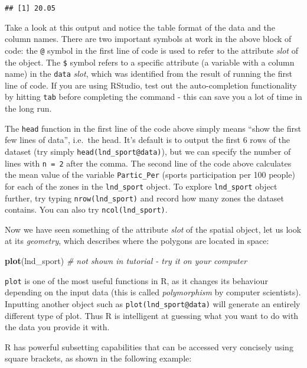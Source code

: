\documentclass[]{article}
\newenvironment{Shaded}{}{}
\newcommand{\KeywordTok}[1]{\textcolor[rgb]{0.00,0.44,0.13}{\textbf{{#1}}}}
\newcommand{\CommentTok}[1]{\textcolor[rgb]{0.38,0.63,0.69}{\textit{{#1}}}}
\newcommand{\NormalTok}[1]{{#1}}
\begin{document}
\begin{verbatim}
## [1] 20.05
\end{verbatim}

Take a look at this output and notice the table format of the data and
the column names. There are two important symbols at work in the above
block of code: the \texttt{@} symbol in the first line of code is used
to refer to the attribute \emph{slot} of the object. The \texttt{\$}
symbol refers to a specific attribute (a variable with a column name) in
the \texttt{data} \emph{slot}, which was identified from the result of
running the first line of code. If you are using RStudio, test out the
auto-completion functionality by hitting \texttt{tab} before completing
the command - this can save you a lot of time in the long run.

The \texttt{head} function in the first line of the code above simply
means ``show the first few lines of data'', i.e.~the head. It's default
is to output the first 6 rows of the dataset (try simply
\texttt{head(lnd\_sport@data)}), but we can specify the number of lines
with \texttt{n = 2} after the comma. The second line of the code above
calculates the mean value of the variable \texttt{Partic\_Per} (sports
participation per 100 people) for each of the zones in the
\texttt{lnd\_sport} object. To explore \texttt{lnd\_sport} object
further, try typing \texttt{nrow(lnd\_sport)} and record how many zones
the dataset contains. You can also try \texttt{ncol(lnd\_sport)}.

Now we have seen something of the attribute \emph{slot} of the spatial
object, let us look at its \emph{geometry}, which describes where the
polygons are located in space:

\begin{Shaded}
\begin{Highlighting}[]
\KeywordTok{plot}\NormalTok{(lnd_sport) }\CommentTok{# not shown in tutorial - try it on your computer}
\end{Highlighting}
\end{Shaded}

\texttt{plot} is one of the most useful functions in R, as it changes
its behaviour depending on the input data (this is called
\emph{polymorphism} by computer scientists). Inputting another object
such as \texttt{plot(lnd\_sport@data)} will generate an entirely
different type of plot. Thus R is intelligent at guessing what you want
to do with the data you provide it with.

R has powerful subsetting capabilities that can be accessed very
concisely using square brackets, as shown in the following example:
\end{document}
